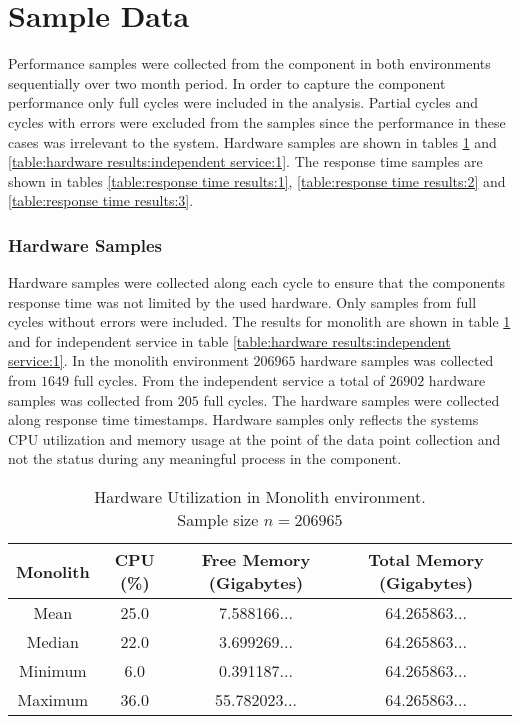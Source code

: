 \section{Sample Data}
Performance samples were collected from the component in both environments sequentially over two month period.
In order to capture the component performance only full cycles were included in the analysis.
Partial cycles and cycles with errors were excluded from the samples since the performance in these cases was irrelevant to the system.
Hardware samples are shown in tables \ref{table:hardware results:monolith:1} and \ref{table:hardware results:independent service:1}.
The response time samples are shown in tables \ref{table:response time results:1}, \ref{table:response time results:2} and \ref{table:response time results:3}.

\subsubsection{Hardware Samples}
Hardware samples were collected along each cycle to ensure that the components response time was not limited by the used hardware.
Only samples from full cycles without errors were included.
The results for monolith are shown in table \ref{table:hardware results:monolith:1} and for independent service in table \ref{table:hardware results:independent service:1}.
In the monolith environment $206965$ hardware samples was collected from $1649$ full cycles.
From the independent service a total of $26902$ hardware samples was collected from $205$ full cycles.
The hardware samples were collected along response time timestamps.
Hardware samples only reflects the systems CPU utilization and memory usage at the point of the data point collection and not the status during any meaningful process in the component.

\begin{table}[ht!]
    \begin{tabular}{|c c c c|} 
        \hline
        Monolith
        & CPU (\%)
        & Free Memory (Gigabytes)
        & Total Memory (Gigabytes) \\ [0.5ex] 
        
        \hline\hline
        Mean
        & 25.0
        & 7.588166...
        & 64.265863... \\ 
        
        Median
        & 22.0
        & 3.699269...
        & 64.265863... \\ 

        Minimum
        & 6.0
        & 0.391187...
        & 64.265863... \\ 
        
        Maximum
        & 36.0
        & 55.782023...
        & 64.265863... \\
        \hline
    \end{tabular}
    \caption{Hardware Utilization in Monolith environment.
    \\ Sample size $n=206 965$}
    \label{table:hardware results:monolith:1}
\end{table}

